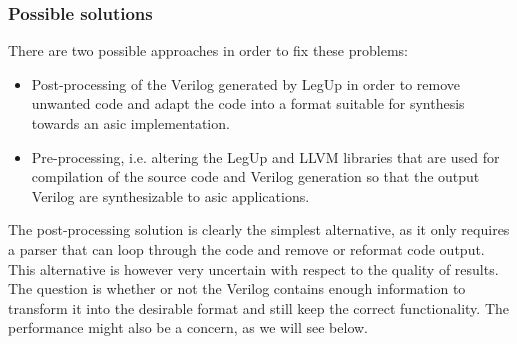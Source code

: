 \subsubsection{Possible solutions}

There are two possible approaches in order to fix these problems:
\begin{itemize}
\item Post-processing of the Verilog generated by LegUp in order to remove unwanted code and adapt the code into a format suitable for synthesis towards an \gls{asic} implementation.
\item Pre-processing, i.e. altering the LegUp and LLVM libraries that are used for compilation of the source code and Verilog generation so that the output Verilog are synthesizable to \gls{asic} applications.
\end{itemize}

The post-processing solution is clearly the simplest alternative, as it only requires a parser that can loop through the code and remove or reformat code output. This alternative is however very uncertain with respect to the quality of results. The question is whether or not the Verilog contains enough information to transform it into the desirable format and still keep the correct functionality. The performance might also be a concern, as we will see below.


